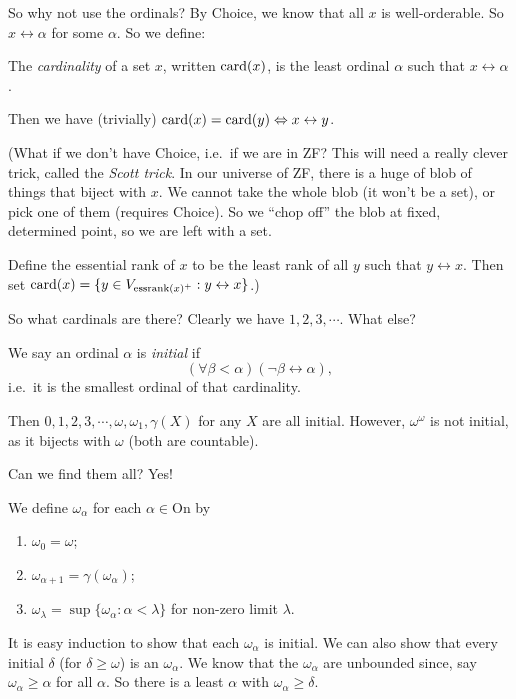 \documentclass[a4paper]{article}
\begin{document}
So why not use the ordinals? By Choice, we know that all $x$ is well-orderable. So $x\leftrightarrow \alpha$ for some $\alpha$. So we define:
\begin{defi}[Cardinality]
  The \emph{cardinality} of a set $x$, written $\operatorname{card}(x)$, is the least ordinal $\alpha$ such that $x\leftrightarrow \alpha$.
\end{defi}
Then we have (trivially) $\operatorname{card}(x) = \operatorname{card}(y) \Leftrightarrow x\leftrightarrow y$.

(What if we don't have Choice, i.e.\ if we are in ZF? This will need a really clever trick, called the \emph{Scott trick}. In our universe of ZF, there is a huge of blob of things that biject with $x$. We cannot take the whole blob (it won't be a set), or pick one of them (requires Choice). So we ``chop off'' the blob at fixed, determined point, so we are left with a set.

Define the essential rank of $x$ to be the least rank of all $y$ such that $y\leftrightarrow x$. Then set $\operatorname{card} (x) = \{y\in V_{\mathrm{essrank}(x)^+}: y\leftrightarrow x\}$.)

So what cardinals are there? Clearly we have $1, 2, 3, \cdots$. What else?

\begin{defi}
  We say an ordinal $\alpha$ is \emph{initial} if
  \[
    (\forall \beta < \alpha)(\neg \beta \leftrightarrow \alpha),
  \]
  i.e.\ it is the smallest ordinal of that cardinality.
\end{defi}

Then $0, 1, 2, 3, \cdots, \omega, \omega_1, \gamma(X)$ for any $X$ are all initial. However, $\omega^\omega$ is not initial, as it bijects with $\omega$ (both are countable).

Can we find them all? Yes!
\begin{defi}\index{$\omega_\alpha$}
  We define $\omega_\alpha$ for each $\alpha \in \mathrm{On}$ by
  \begin{enumerate}
    \item $\omega_0 = \omega$;
    \item $\omega_{\alpha + 1} = \gamma(\omega_\alpha)$;
    \item $\omega_\lambda = \sup\{\omega_\alpha: \alpha < \lambda\}$ for non-zero limit $\lambda$.
  \end{enumerate}
\end{defi}
It is easy induction to show that each $\omega_\alpha$ is initial. We can also show that every initial $\delta$ (for $\delta \geq \omega$) is an $\omega_\alpha$. We know that the $\omega_\alpha$ are unbounded since, say $\omega_\alpha \geq \alpha$ for all $\alpha$. So there is a least $\alpha$ with $\omega_\alpha \geq \delta$.
\end{document}
